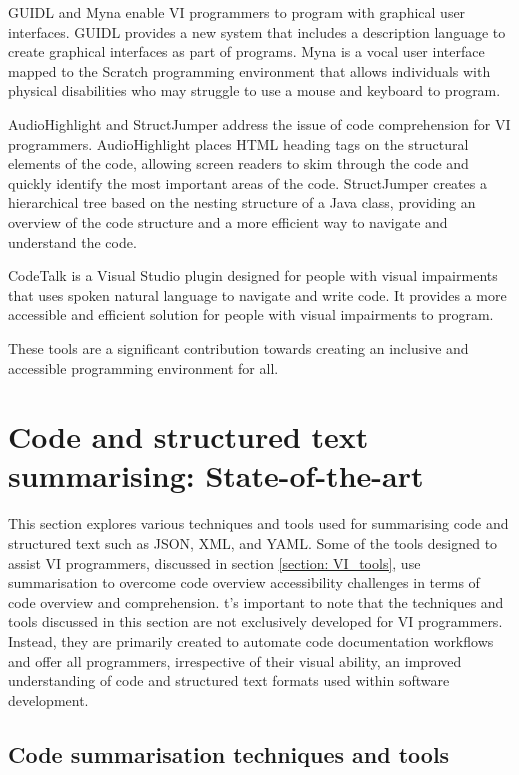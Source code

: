 \documentclass{l4proj}
\begin{document}
GUIDL and Myna enable VI programmers to program with graphical user interfaces. GUIDL provides a new system that includes a description language to create graphical interfaces as part of programs. Myna is a vocal user interface mapped to the Scratch programming environment that allows individuals with physical disabilities who may struggle to use a mouse and keyboard to program.

AudioHighlight and StructJumper address the issue of code comprehension for VI programmers. AudioHighlight places HTML heading tags on the structural elements of the code, allowing screen readers to skim through the code and quickly identify the most important areas of the code. StructJumper creates a hierarchical tree based on the nesting structure of a Java class, providing an overview of the code structure and a more efficient way to navigate and understand the code.

CodeTalk is a Visual Studio plugin designed for people with visual impairments that uses spoken natural language to navigate and write code. It provides a more accessible and efficient solution for people with visual impairments to program.

These tools are a significant contribution towards creating an inclusive and accessible programming environment for all.

\section{Code and structured text summarising: State-of-the-art}

This section explores various techniques and tools used for summarising code and structured text such as JSON, XML, and YAML. Some of the tools designed to assist VI programmers, discussed in section \ref{section: VI_tools}, use summarisation to overcome code overview accessibility challenges in terms of code overview and comprehension. t's important to note that the techniques and tools discussed in this section are not exclusively developed for VI programmers. Instead, they are primarily created to automate code documentation workflows and offer all programmers, irrespective of their visual ability, an improved understanding of code and structured text formats used within software development.

\subsection{Code summarisation techniques and tools}
\label{section:code_summary}
\end{document}
